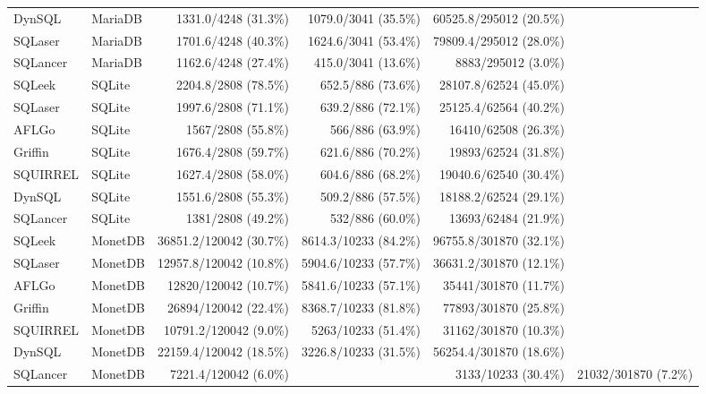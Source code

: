 \begin{tabular}{llrrr}
DynSQL & MariaDB & 1331.0/4248 (31.3\%) & 1079.0/3041 (35.5\%) & 60525.8/295012 (20.5\%) \\
SQLaser & MariaDB & 1701.6/4248 (40.3\%) & 1624.6/3041 (53.4\%) & 79809.4/295012 (28.0\%) \\
SQLancer & MariaDB & 1162.6/4248 (27.4\%) & 415.0/3041 (13.6\%) & 8883/295012 (3.0\%) \\
SQLeek & SQLite & 2204.8/2808 (78.5\%) & 652.5/886 (73.6\%) & 28107.8/62524 (45.0\%) \\
SQLaser & SQLite & 1997.6/2808 (71.1\%) & 639.2/886 (72.1\%) & 25125.4/62564 (40.2\%) \\
AFLGo & SQLite & 1567/2808 (55.8\%) & 566/886 (63.9\%) & 16410/62508 (26.3\%) \\
Griffin & SQLite & 1676.4/2808 (59.7\%) & 621.6/886 (70.2\%) & 19893/62524 (31.8\%) \\
SQUIRREL & SQLite & 1627.4/2808 (58.0\%) & 604.6/886 (68.2\%) & 19040.6/62540 (30.4\%) \\
DynSQL & SQLite & 1551.6/2808 (55.3\%) & 509.2/886 (57.5\%) & 18188.2/62524 (29.1\%) \\
SQLancer & SQLite & 1381/2808 (49.2\%) & 532/886 (60.0\%) & 13693/62484 (21.9\%) \\
SQLeek & MonetDB & 36851.2/120042 (30.7\%) & 8614.3/10233 (84.2\%) & 96755.8/301870 (32.1\%) \\
SQLaser & MonetDB & 12957.8/120042 (10.8\%) & 5904.6/10233 (57.7\%) & 36631.2/301870 (12.1\%) \\
AFLGo & MonetDB & 12820/120042 (10.7\%) & 5841.6/10233 (57.1\%) & 35441/301870 (11.7\%) \\
Griffin & MonetDB & 26894/120042 (22.4\%) & 8368.7/10233 (81.8\%) & 77893/301870 (25.8\%) \\
SQUIRREL & MonetDB & 10791.2/120042 (9.0\%) & 5263/10233 (51.4\%) & 31162/301870 (10.3\%) \\
DynSQL & MonetDB & 22159.4/120042 (18.5\%) & 3226.8/10233 (31.5\%) & 56254.4/301870 (18.6\%) \\
SQLancer & MonetDB & 7221.4/120042 (6.0\%) & & 3133/10233 (30.4\%) & 21032/301870 (7.2\%) \\
\hline
\end{tabular}
